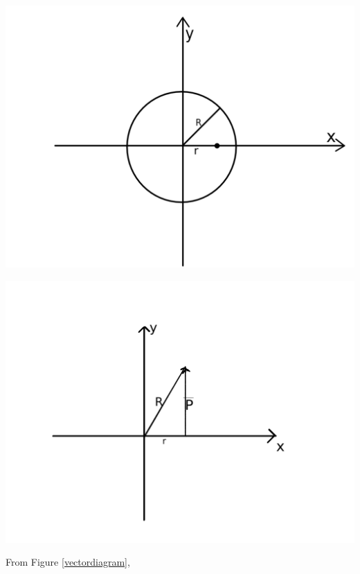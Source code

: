 \centering
\begin{minipage}[b]{0.4\textwidth}
      \includegraphics[width=\textwidth]{fig2}
      \label{ring}
\end{minipage}
\hfill
\begin{minipage}[b]{0.4\textwidth}
      \includegraphics[width=\textwidth]{fig1}
      \label{vectordiagram}
\end{minipage}

From Figure \ref{vectordiagram}, 


